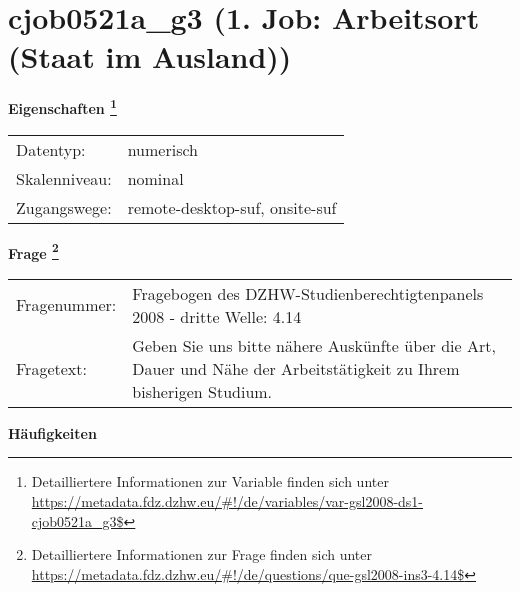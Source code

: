 
    \setcounter{footnote}{0}

    \vspace*{-1.8cm}
	\section{cjob0521a\_g3 (1. Job: Arbeitsort (Staat im Ausland))}
	\label{section:cjob0521a_g3}



    \vspace*{0.5cm}
    \noindent\textbf{Eigenschaften
	\footnote{Detailliertere Informationen zur Variable finden sich unter
		\url{https://metadata.fdz.dzhw.eu/\#!/de/variables/var-gsl2008-ds1-cjob0521a_g3$}}}\\
	\begin{tabularx}{\hsize}{@{}lX}
	Datentyp: & numerisch \\
	Skalenniveau: & nominal \\
	Zugangswege: &
	  remote-desktop-suf, 
	  onsite-suf
 \\
    \end{tabularx}



				\vspace*{0.5cm}
                \noindent\textbf{Frage
	                \footnote{Detailliertere Informationen zur Frage finden sich unter
		              \url{https://metadata.fdz.dzhw.eu/\#!/de/questions/que-gsl2008-ins3-4.14$}}}\\
				\begin{tabularx}{\hsize}{@{}lX}
					Fragenummer: &
					  Fragebogen des DZHW-Studienberechtigtenpanels 2008 - dritte Welle:
					  4.14
 \\
					Fragetext: & Geben Sie uns bitte nähere Auskünfte über die Art, Dauer und Nähe der Arbeitstätigkeit zu Ihrem bisherigen Studium. \\
				\end{tabularx}





        		\vspace*{0.5cm}
                \noindent\textbf{Häufigkeiten}

